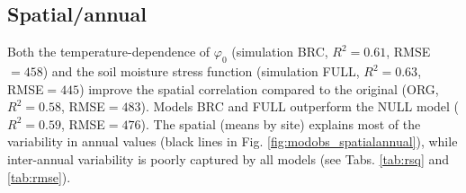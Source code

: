 \documentclass{myreport}
\begin{document}
\clearpage

\subsection{Spatial/annual}

Both the temperature-dependence of $\varphi_0$ (simulation BRC, $R^2=0.61$, RMSE$=458$) and the soil moisture stress function (simulation FULL, $R^2=0.63$, RMSE$=445$) improve the spatial correlation compared to the original (ORG, $R^2=0.58$, RMSE$=483$). Models BRC and FULL outperform the NULL model ($R^2=0.59$, RMSE$=476$). The spatial (means by site) explains most of the variability in annual values (black lines in Fig. \ref{fig:modobs_spatialannual}), while inter-annual variability is poorly captured by all models (see Tabs. \ref{tab:rsq} and \ref{tab:rmse}).
\end{document}
